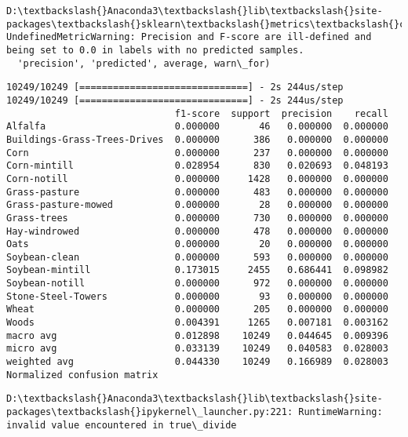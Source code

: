 \documentclass[11pt]{article}
\begin{document}
    \begin{Verbatim}[commandchars=\\\{\}]
D:\textbackslash{}Anaconda3\textbackslash{}lib\textbackslash{}site-packages\textbackslash{}sklearn\textbackslash{}metrics\textbackslash{}classification.py:1143: UndefinedMetricWarning: Precision and F-score are ill-defined and being set to 0.0 in labels with no predicted samples.
  'precision', 'predicted', average, warn\_for)

    \end{Verbatim}

    \begin{Verbatim}[commandchars=\\\{\}]
10249/10249 [==============================] - 2s 244us/step
10249/10249 [==============================] - 2s 244us/step
                              f1-score  support  precision    recall
Alfalfa                       0.000000       46   0.000000  0.000000
Buildings-Grass-Trees-Drives  0.000000      386   0.000000  0.000000
Corn                          0.000000      237   0.000000  0.000000
Corn-mintill                  0.028954      830   0.020693  0.048193
Corn-notill                   0.000000     1428   0.000000  0.000000
Grass-pasture                 0.000000      483   0.000000  0.000000
Grass-pasture-mowed           0.000000       28   0.000000  0.000000
Grass-trees                   0.000000      730   0.000000  0.000000
Hay-windrowed                 0.000000      478   0.000000  0.000000
Oats                          0.000000       20   0.000000  0.000000
Soybean-clean                 0.000000      593   0.000000  0.000000
Soybean-mintill               0.173015     2455   0.686441  0.098982
Soybean-notill                0.000000      972   0.000000  0.000000
Stone-Steel-Towers            0.000000       93   0.000000  0.000000
Wheat                         0.000000      205   0.000000  0.000000
Woods                         0.004391     1265   0.007181  0.003162
macro avg                     0.012898    10249   0.044645  0.009396
micro avg                     0.033139    10249   0.040583  0.028003
weighted avg                  0.044330    10249   0.166989  0.028003
Normalized confusion matrix

    \end{Verbatim}

    \begin{Verbatim}[commandchars=\\\{\}]
D:\textbackslash{}Anaconda3\textbackslash{}lib\textbackslash{}site-packages\textbackslash{}ipykernel\_launcher.py:221: RuntimeWarning: invalid value encountered in true\_divide

    \end{Verbatim}
\end{document}
